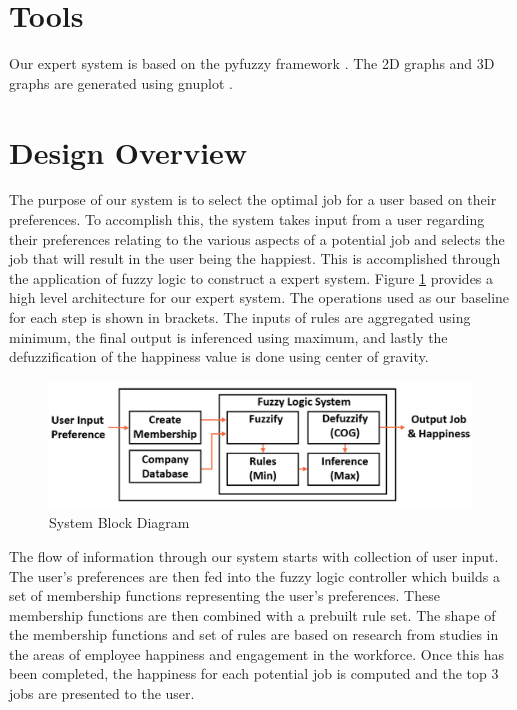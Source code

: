 \documentclass[12pt,fleqn,reqno,letterpaper]{article}
\begin{document}
\section{Tools}
Our expert system is based on the pyfuzzy framework \cite{pyfuzzy}. The 2D graphs and 3D graphs are generated using gnuplot \cite{gnu-plot}.

\section{Design Overview}
The purpose of our system is to select the optimal job for a user based on their preferences. To accomplish this, the system takes input from a user regarding their preferences relating to the various aspects of a potential job and selects the job that will result in the user being the happiest. This is accomplished through the application of fuzzy logic to construct a expert system. Figure \ref{fig:block-diagram} provides a high level architecture for our expert system. The operations used as our baseline for each step is shown in brackets. The inputs of rules are aggregated using minimum, the final output is inferenced using maximum, and lastly the defuzzification of the happiness value is done using center of gravity.

\begin{figure}[H]
  \centering
  \includegraphics[scale=0.3,natwidth=1166,natheight=352]{fig/BLOCK_DIAGRAM.png}
  \caption{System Block Diagram}
  \label{fig:block-diagram}
\end{figure}

The flow of information through our system starts with collection of user input. The user’s preferences are then fed into the fuzzy logic controller which builds a set of membership functions representing the user’s preferences. These membership functions are then combined with a prebuilt rule set. The shape of the membership functions and set of rules are based on research from studies in the areas of employee happiness and engagement in the workforce. Once this has been completed, the happiness for each potential job is computed and the top 3 jobs are presented to the user.
\end{document}
